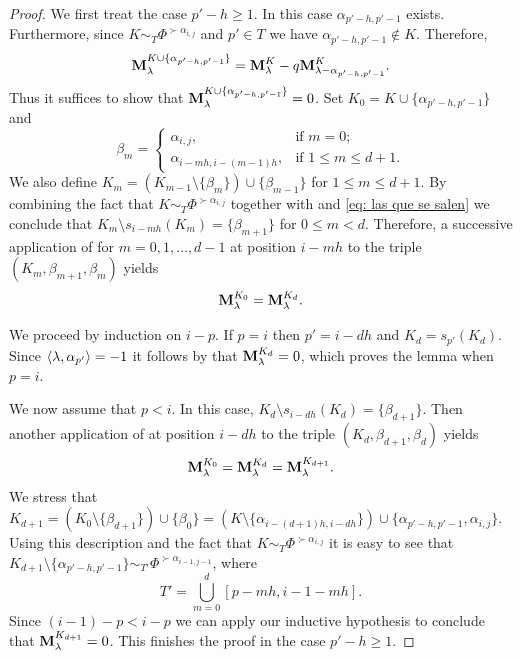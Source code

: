 \begin{proof}
 We first treat the case  $p'-h\geq 1$.  In this case $\alpha_{p'-h,p'-1}$ exists. Furthermore, since $K\sim_T \Phi^{\succ\alpha_{i,j}}$ and $p'\in T$ we have $\alpha_{p'-h,p'-1}\not \in K$. Therefore, 
 \begin{equation}
     \mathbf{M}_{\lambda}^{K\cup \{  \alpha_{p'-h,p'-1}   \} } = \mathbf{M}_{\lambda }^K- q\mathbf{M}_{\lambda - \alpha_{p'-h,p'-1}}^{K}. 
 \end{equation}
Thus it suffices to show that  $\mathbf{M}_{\lambda}^{K\cup \{  \alpha_{p'-h,p'-1}   \} }=0$. Set $K_0 =K\cup \{  \alpha_{p'-h,p'-1}   \} $  and
\begin{equation}
\beta_m = \begin{cases}
   \alpha_{i,j}, & \mbox{if } m=0; \\
   \alpha_{i-mh,i-(m-1)h},    &  \mbox{if } 1\leq m \leq d+1.  
\end{cases}
\end{equation}
 We also define $K_m=(K_{m-1}\setminus \{\beta_m\}) \cup \{ \beta_{m-1} \}$ for $1\leq m \leq d+1$.  
 By combining the fact that $K \sim_{T} \Phi^{\succ\alpha_{i,j}}$ together with  and \eqref{eq: las que se salen} we conclude that $K_m \setminus s_{i-mh}(K_m)  =\{  \beta_{m+1} \}$ for $0\leq m < d$.   Therefore, a successive application of  for $m=0,1,\ldots , d-1$  at position $i-mh$ to  the triple $(K_m,\beta_{m+1},\beta_m )$ yields 
\begin{equation}  \label{eq: K0 equal to Kd}
    \mathbf{M}_{\lambda}^{K_0} =\mathbf{M}_{\lambda}^{K_d}.  
\end{equation}

We proceed by induction on $i-p$. 
If $p=i$ then  $p'=i-dh$ and  $K_d=  s_{p'}(K_d)$.  Since $\langle \lambda , \alpha_{p'} \rangle=-1$ it follows by  that $\mathbf{M}_{\lambda}^{K_d}=0$, which proves the lemma when $p=i$. 


 We now assume that $p<i$.
 In this case, $K_d\setminus s_{i-dh}(K_d)= \{ \beta_{d+1} \}$. 
 Then another application of  at position $i-dh$ to the triple $(K_d,\beta_{d+1}, \beta_d)$ yields 
\begin{equation}  \label{eq: K0 equal to Kd}
    \mathbf{M}_{\lambda}^{K_0} =\mathbf{M}_{\lambda}^{K_d}= \mathbf{M}_{\lambda}^{K_{d+1}}.  
\end{equation}
We stress that $K_{d+1} = (K_0 \setminus \{ \beta_{d+1} \}) \cup \{\beta_0\}  = (K \setminus \{ \alpha_{i-(d+1)h,i-dh} \}) \cup \{\alpha_{p'-h,p'-1},\alpha_{i,j}\}$. 
Using this description and the fact that $K\sim_T \Phi^{\succ\alpha_{i,j}}$ it is easy to see  that $K_{d+1}\setminus \{ \alpha_{p'-h,p'-1} \} \sim_{T'} \Phi^{\succ\alpha_{i-1,j-1}}$, where 
$$T' =  \bigcup_{m = 0}^{d} [p-mh,i-1-mh].$$
Since $(i-1)-p < i-p$ we can apply our inductive hypothesis to conclude that $\mathbf{M}_\lambda^{K_{d+1}} =0$. This finishes the proof in the case $p'-h\geq 1$. 


\end{proof}
